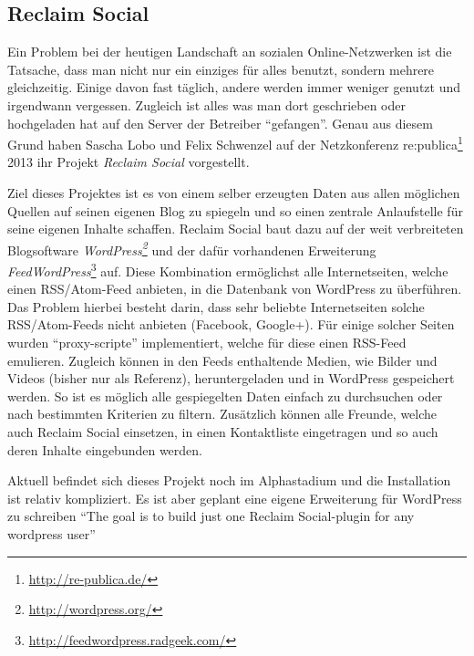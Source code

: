 
\subsection{Reclaim Social} %
\label{sub:reclaim_social}

Ein Problem bei der heutigen Landschaft an sozialen Online-Netzwerken ist die Tatsache, dass man nicht nur ein einziges für alles benutzt, sondern mehrere gleichzeitig. Einige davon fast täglich, andere werden immer weniger genutzt und irgendwann vergessen. Zugleich ist alles was man dort geschrieben oder hochgeladen hat auf den Server der Betreiber \enquote{gefangen}. Genau aus diesem Grund haben Sascha Lobo und Felix Schwenzel auf der Netzkonferenz re:publica\footnote{\url{http://re-publica.de/}} 2013 ihr Projekt \emph{Reclaim Social} \cite{Schwenzel2013} vorgestellt.

Ziel dieses Projektes ist es von einem selber erzeugten Daten aus allen möglichen Quellen auf seinen eigenen Blog zu spiegeln und so einen zentrale Anlaufstelle für seine eigenen Inhalte schaffen. Reclaim Social baut dazu auf der weit verbreiteten Blogsoftware \emph{WordPress\footnote{\url{http://wordpress.org/}}} und der dafür vorhandenen Erweiterung \emph{FeedWordPress}\footnote{\url{http://feedwordpress.radgeek.com/}} auf. Diese Kombination ermöglichst alle Internetseiten, welche einen RSS/Atom-Feed anbieten, in die Datenbank von WordPress zu überführen. Das Problem hierbei besteht darin, dass sehr beliebte Internetseiten solche RSS/Atom-Feeds nicht anbieten (Facebook, Google+). Für einige solcher Seiten wurden \enquote{proxy-scripte}\cite[\enquote{Tech Specs Details}]{Schwenzel2013} implementiert, welche für diese einen RSS-Feed emulieren. Zugleich können in den Feeds enthaltende Medien, wie Bilder und Videos (bisher nur als Referenz), heruntergeladen und in WordPress gespeichert werden. So ist es möglich alle gespiegelten Daten einfach zu durchsuchen oder nach bestimmten Kriterien zu filtern. Zusätzlich können alle Freunde, welche auch Reclaim Social einsetzen, in einen Kontaktliste eingetragen und so auch deren Inhalte eingebunden werden.

Aktuell befindet sich dieses Projekt noch im Alphastadium und die Installation ist relativ kompliziert. Es ist aber geplant eine eigene Erweiterung für WordPress zu schreiben \enquote{The goal is to build just one Reclaim Social-plugin for any wordpress user}\cite[\enquote{How Does It Work}]{Schwenzel2013}



